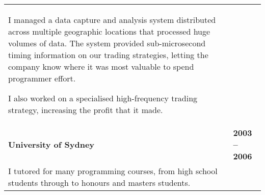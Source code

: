 \documentclass[]{article}
\begin{document}
\begin{table*}[h!]
\begin{tabular}[h!]{p{12.7cm}l}

\vspace{0.05cm}
\hspace{0.5cm} I managed a data capture and analysis system distributed across multiple geographic locations that processed huge volumes of data. The system provided sub-microsecond timing information on our trading strategies, letting the company know where it was most valuable to spend programmer effort.

\hspace{0.5cm} I also worked on a specialised high-frequency trading strategy, increasing the profit that it made.

& \\

\textbf{University of Sydney} & \textbf{2003 -- 2006}\\

\vspace{0.05cm}
\hspace{0.5cm} I tutored for many programming courses, from high school students through to honours and masters students.

& \\




\end{tabular}
\end{table*}
\end{document}
